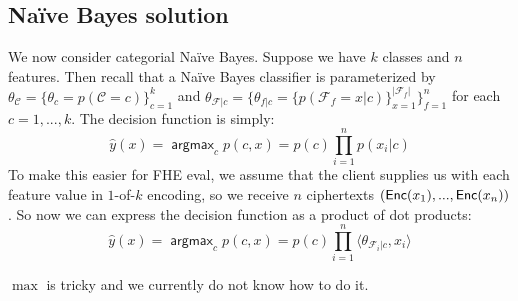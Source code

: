 \documentclass[11pt]{article}
\DeclareMathOperator*{\argmax}{\mathsf{argmax}}
\begin{document}





\subsection{Na\"ive Bayes solution}

%
\newcommand{\NB}{Na\"ive Bayes}

We now consider categorial \NB{}. Suppose we have $k$ classes and $n$ features.
Then recall that a \NB{} classifier is parameterized by $\theta_{\mathcal{C}} =
\{\theta_{c}=p(\mathcal{C}=c)\}_{c=1}^{k}$ and $\theta_{\mathcal{F}|c} =
\{\theta_{f|c}= \{ p(\mathcal{F}_f=x|c) \}_{x=1}^{|\mathcal{F}_f|}
\}_{f=1}^{n}$ for each $c = 1,...,k$. The decision function is simply:
\begin{equation*}
  \hat{y}(x) = \argmax_{c} p(c, x) = p(c)\prod\limits_{i=1}^{n}p(x_i|c)
\end{equation*}
To make this easier for FHE eval, we assume that the client supplies us with each feature value
in $1$-of-$k$ encoding, so we receive $n$ ciphertexts $(\mathsf{Enc}(x_1), ..., \mathsf{Enc}(x_n))$. So now we
can express the decision function as a product of dot products:
\begin{equation*}
  \hat{y}(x) = \argmax_{c} p(c, x) = p(c)\prod\limits_{i=1}^{n} \langle \theta_{\mathcal{F}_i|c}, x_i \rangle
\end{equation*}

$\max$ is tricky and we currently do not know how to do it.
\end{document}
